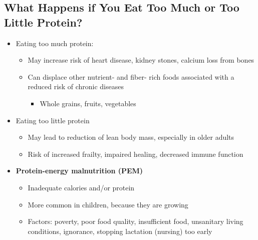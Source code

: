 \documentclass[12pt]{article}
\begin{document}
        \subsection{What Happens if You Eat Too Much or Too Little Protein?}
            \begin{itemize}
                \item Eating too much protein:
                    \begin{itemize}
                        \item May increase risk of heart disease, kidney stones, calcium loss from bones
                        \item Can displace other nutrient- and fiber- rich foods associated with a reduced risk of chronic diseases
                            \begin{itemize}
                                \item Whole grains, fruits, vegetables
                            \end{itemize}
                    \end{itemize}
                \item Eating too little protein
                    \begin{itemize}
                        \item May lead to reduction of lean body mass, especially in older adults
                        \item Risk of increased frailty, impaired healing, decreased immune function
                    \end{itemize}
                \item \textbf{Protein-energy malnutrition (PEM)}
                    \begin{itemize}
                        \item Inadequate calories and/or protein
                        \item More common in children, because they are growing
                        \item Factors: poverty, poor food quality, insufficient food, unsanitary living conditions, ignorance, stopping lactation (nursing) too early
                    \end{itemize}
            \end{itemize}
\end{document}
